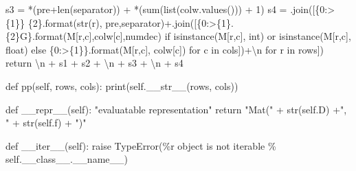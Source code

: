 \documentclass[
  letterpaper,
  DIV=11,
  numbers=noendperiod]{scrartcl}
\newenvironment{Shaded}{\begin{snugshade}}{\end{snugshade}}
\newcommand{\BuiltInTok}[1]{\textcolor[rgb]{0.00,0.23,0.31}{#1}}
\newcommand{\CharTok}[1]{\textcolor[rgb]{0.13,0.47,0.30}{#1}}
\newcommand{\CommentTok}[1]{\textcolor[rgb]{0.37,0.37,0.37}{#1}}
\newcommand{\ControlFlowTok}[1]{\textcolor[rgb]{0.00,0.23,0.31}{#1}}
\newcommand{\DecValTok}[1]{\textcolor[rgb]{0.68,0.00,0.00}{#1}}
\newcommand{\FunctionTok}[1]{\textcolor[rgb]{0.28,0.35,0.67}{#1}}
\newcommand{\KeywordTok}[1]{\textcolor[rgb]{0.00,0.23,0.31}{#1}}
\newcommand{\NormalTok}[1]{\textcolor[rgb]{0.00,0.23,0.31}{#1}}
\newcommand{\OperatorTok}[1]{\textcolor[rgb]{0.37,0.37,0.37}{#1}}
\newcommand{\PreprocessorTok}[1]{\textcolor[rgb]{0.68,0.00,0.00}{#1}}
\newcommand{\SpecialCharTok}[1]{\textcolor[rgb]{0.37,0.37,0.37}{#1}}
\newcommand{\StringTok}[1]{\textcolor[rgb]{0.13,0.47,0.30}{#1}}
\newcommand{\VariableTok}[1]{\textcolor[rgb]{0.07,0.07,0.07}{#1}}
\begin{document}
\begin{Shaded}
\begin{Highlighting}[numbers=left,,]
\NormalTok{        s3 }\OperatorTok{=} \StringTok{\textquotesingle{} \textquotesingle{}}\OperatorTok{*}\NormalTok{(pre}\OperatorTok{+}\BuiltInTok{len}\NormalTok{(separator)) }\OperatorTok{+} \StringTok{\textquotesingle{}{-}\textquotesingle{}}\OperatorTok{*}\NormalTok{(}\BuiltInTok{sum}\NormalTok{(}\BuiltInTok{list}\NormalTok{(colw.values())) }\OperatorTok{+} \DecValTok{1}\NormalTok{)}
\NormalTok{        s4 }\OperatorTok{=} \StringTok{\textquotesingle{}\textquotesingle{}}\NormalTok{.join([}\StringTok{\textquotesingle{}\{0:\textgreater{}}\SpecialCharTok{\{1\}}\StringTok{\} }\SpecialCharTok{\{2\}}\StringTok{\textquotesingle{}}\NormalTok{.}\BuiltInTok{format}\NormalTok{(}\BuiltInTok{str}\NormalTok{(r), pre,separator)}\OperatorTok{+}\StringTok{\textquotesingle{}\textquotesingle{}}\NormalTok{.join([}\StringTok{\textquotesingle{}\{0:\textgreater{}}\SpecialCharTok{\{1\}}\StringTok{.}\SpecialCharTok{\{2\}}\StringTok{G\}\textquotesingle{}}\NormalTok{.}\BuiltInTok{format}\NormalTok{(M[r,c],colw[c],numdec) }\ControlFlowTok{if} \BuiltInTok{isinstance}\NormalTok{(M[r,c], }\BuiltInTok{int}\NormalTok{) }\KeywordTok{or} \BuiltInTok{isinstance}\NormalTok{(M[r,c], }\BuiltInTok{float}\NormalTok{) }\ControlFlowTok{else} \StringTok{\textquotesingle{}\{0:\textgreater{}}\SpecialCharTok{\{1\}}\StringTok{\}\textquotesingle{}}\NormalTok{.}\BuiltInTok{format}\NormalTok{(M[r,c], colw[c]) }\ControlFlowTok{for}\NormalTok{ c }\KeywordTok{in}\NormalTok{ cols])}\OperatorTok{+}\StringTok{\textquotesingle{}}\CharTok{\textbackslash{}n}\StringTok{\textquotesingle{}} \ControlFlowTok{for}\NormalTok{ r }\KeywordTok{in}\NormalTok{ rows])}
        \ControlFlowTok{return} \StringTok{\textquotesingle{}}\CharTok{\textbackslash{}n}\StringTok{\textquotesingle{}} \OperatorTok{+}\NormalTok{ s1 }\OperatorTok{+}\NormalTok{ s2 }\OperatorTok{+} \StringTok{\textquotesingle{}}\CharTok{\textbackslash{}n}\StringTok{\textquotesingle{}} \OperatorTok{+}\NormalTok{ s3 }\OperatorTok{+} \StringTok{\textquotesingle{}}\CharTok{\textbackslash{}n}\StringTok{\textquotesingle{}} \OperatorTok{+}\NormalTok{ s4}

    \KeywordTok{def}\NormalTok{ pp(}\VariableTok{self}\NormalTok{, rows, cols):}
        \BuiltInTok{print}\NormalTok{(}\VariableTok{self}\NormalTok{.}\FunctionTok{\_\_str\_\_}\NormalTok{(rows, cols))}

    \KeywordTok{def} \FunctionTok{\_\_repr\_\_}\NormalTok{(}\VariableTok{self}\NormalTok{):}
        \CommentTok{"evaluatable representation"}
        \ControlFlowTok{return} \StringTok{"Mat("} \OperatorTok{+} \BuiltInTok{str}\NormalTok{(}\VariableTok{self}\NormalTok{.D) }\OperatorTok{+}\StringTok{", "} \OperatorTok{+} \BuiltInTok{str}\NormalTok{(}\VariableTok{self}\NormalTok{.f) }\OperatorTok{+} \StringTok{")"}

    \KeywordTok{def} \FunctionTok{\_\_iter\_\_}\NormalTok{(}\VariableTok{self}\NormalTok{):}
        \ControlFlowTok{raise} \PreprocessorTok{TypeError}\NormalTok{(}\StringTok{\textquotesingle{}}\SpecialCharTok{\%r}\StringTok{ object is not iterable\textquotesingle{}} \OperatorTok{\%} \VariableTok{self}\NormalTok{.\_\_class\_\_.}\VariableTok{\_\_name\_\_}\NormalTok{)}
\end{Highlighting}
\end{Shaded}
\end{document}
